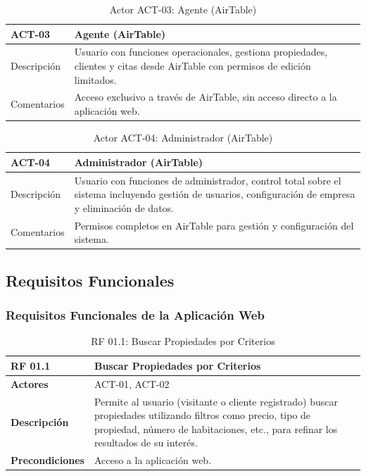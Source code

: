 \begin{table}[H]
\centering
\begin{tabular}{|p{3cm}|p{10cm}|}
\hline
\rowcolor{tealblue}
{\textbf{ACT-03}} & {\textbf{Agente (AirTable)}} \\
\hline
Descripción & Usuario con funciones operacionales, gestiona propiedades, clientes y citas desde AirTable con permisos de edición limitados. \\
\hline
Comentarios & Acceso exclusivo a través de AirTable, sin acceso directo a la aplicación web. \\
\hline
\end{tabular}
\caption{Actor ACT-03: Agente (AirTable)}
\end{table}

\begin{table}[H]
\centering
\begin{tabular}{|p{3cm}|p{10cm}|}
\hline
\rowcolor{tealblue}
{\textbf{ACT-04}} & {\textbf{Administrador (AirTable)}} \\
\hline
Descripción & Usuario con funciones de administrador, control total sobre el sistema incluyendo gestión de usuarios, configuración de empresa y eliminación de datos. \\
\hline
Comentarios & Permisos completos en AirTable para gestión y configuración del sistema. \\
\hline
\end{tabular}
\caption{Actor ACT-04: Administrador (AirTable)}
\end{table}


\subsection{Requisitos Funcionales}


\subsubsection{Requisitos Funcionales de la Aplicación Web}


\begin{table}[H]
\centering
\begin{tabular}{|p{3cm}|p{10cm}|}
\hline
\rowcolor{tealblue}
\textbf{RF 01.1} & \textbf{Buscar Propiedades por Criterios} \\
\hline
\textbf{Actores} & ACT-01, ACT-02 \\
\hline
\textbf{Descripción} & Permite al usuario (visitante o cliente registrado) buscar propiedades utilizando filtros como precio, tipo de propiedad, número de habitaciones, etc., para refinar los resultados de su interés. \\
\hline
\textbf{Precondiciones} & Acceso a la aplicación web. \\
\hline
\end{tabular}
\caption{RF 01.1: Buscar Propiedades por Criterios}
\end{table}

